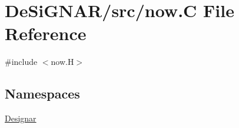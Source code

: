 \hypertarget{now_8_c}{}\section{De\+Si\+G\+N\+A\+R/src/now.C File Reference}
\label{now_8_c}
{\ttfamily \#include $<$now.\+H$>$}\newline
\subsection*{Namespaces}
\begin{DoxyCompactItemize}
\item 
 \hyperlink{namespace_designar}{Designar}
\end{DoxyCompactItemize}
